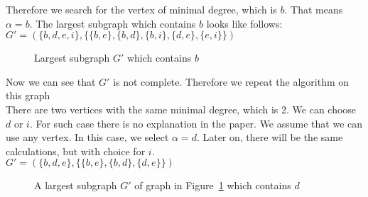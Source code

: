 \documentclass[12pt, xcolor=dvipsnames]{scrartcl}
\theoremstyle{definition}
\theoremstyle{definition}
\begin{document}
          Therefore we search for the vertex of minimal degree, which is $b$.
          That means $\alpha = b$.
          The largest subgraph which contains $b$ looks like follows:\\
          $G' = (\{b,d,e,i\},\{\{b,e\},\{b,d\},\{b,i\},\{d,e\},\{e,i\}\})$ 
          \begin{figure}[H]
            \centering
            \caption{Largest subgraph $G'$ which contains $b$}
            \label{fig:third-step}
          \end{figure}

          Now we can see that $G'$ is not complete. Therefore we repeat the algorithm on this graph \\
          There are two vertices with the same minimal degree, which is 2.
          We can choose $d$ or $i$.
          For such case there is no explanation in the paper.
          We assume that we can use any vertex.
          In this case, we select $\alpha = d$.
          Later on, there will be the same calculations, but with choice for $i$.
          \\
          $G' = (\{b,d,e\},\{\{b,e\},\{b,d\},\{d,e\}\})$ 

          \begin{figure}[H]
            \centering
            \caption{A largest subgraph $G'$ of graph in Figure~\ref{fig:third-step}
            which contains  $d$}
          \end{figure}
\end{document}
